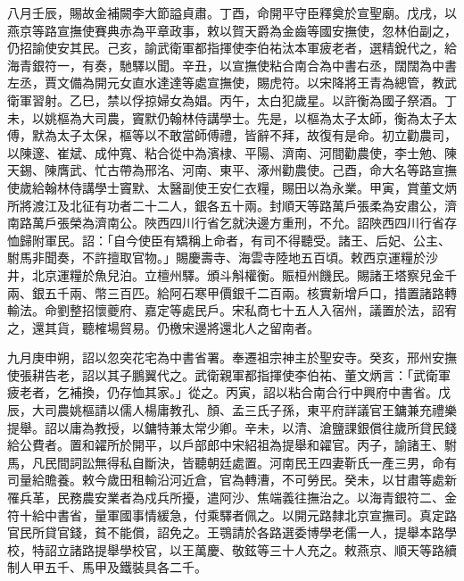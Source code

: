 \begin{pinyinscope}
 八月壬辰，賜故金補闕李大節謚貞肅。丁酉，命開平守臣釋奠於宣聖廟。戊戌，以燕京等路宣撫使賽典赤為平章政事，敕以賀天爵為金齒等國安撫使，忽林伯副之，仍招諭使安其民。己亥，諭武衛軍都指揮使李伯祐汰本軍疲老者，選精銳代之，給海青銀符一，有奏，馳驛以聞。辛丑，以宣撫使粘合南合為中書右丞，闊闊為中書左丞，賈文備為開元女直水達達等處宣撫使，賜虎符。以宋降將王青為總管，教武衛軍習射。乙巳，禁以俘掠婦女為娼。丙午，太白犯歲星。以許衡為國子祭酒。丁未，以姚樞為大司農，竇默仍翰林侍講學士。先是，以樞為太子太師，衡為太子太傅，默為太子太保，樞等以不敢當師傅禮，皆辭不拜，故復有是命。初立勸農司，以陳邃、崔斌、成仲寬、粘合從中為濱棣、平陽、濟南、河間勸農使，李士勉、陳天錫、陳膺武、忙古帶為邢洺、河南、東平、涿州勸農使。己酉，命大名等路宣撫使歲給翰林侍講學士竇默、太醫副使王安仁衣糧，賜田以為永業。甲寅，賞董文炳所將渡江及北征有功者二十二人，銀各五十兩。封順天等路萬戶張柔為安肅公，濟南路萬戶張榮為濟南公。陜西四川行省乞就決邊方重刑，不允。詔陜西四川行省存恤歸附軍民。詔：「自今使臣有矯稱上命者，有司不得聽受。諸王、后妃、公主、駙馬非聞奏，不許擅取官物。」賜慶壽寺、海雲寺陸地五百頃。敕西京運糧於沙井，北京運糧於魚兒泊。立檀州驛。頒斗斛權衡。賑桓州饑民。賜諸王塔察兒金千兩、銀五千兩、幣三百匹。給阿石寒甲價銀千二百兩。核實新增戶口，措置諸路轉輸法。命劉整招懷夔府、嘉定等處民戶。宋私商七十五人入宿州，議置於法，詔宥之，還其貨，聽榷場貿易。仍檄宋邊將還北人之留南者。



 九月庚申朔，詔以忽突花宅為中書省署。奉遷祖宗神主於聖安寺。癸亥，邢州安撫使張耕告老，詔以其子鵬翼代之。武衛親軍都指揮使李伯祐、董文炳言：「武衛軍疲老者，乞補換，仍存恤其家。」從之。丙寅，詔以粘合南合行中興府中書省。戊辰，大司農姚樞請以儒人楊庸教孔、顏、孟三氏子孫，東平府詳議官王鏞兼充禮樂提舉。詔以庸為教授，以鏞特兼太常少卿。辛未，以清、滄鹽課銀償往歲所貸民錢給公費者。置和糴所於開平，以戶部郎中宋紹祖為提舉和糴官。丙子，諭諸王、駙馬，凡民間詞訟無得私自斷決，皆聽朝廷處置。河南民王四妻靳氏一產三男，命有司量給贍養。敕今歲田租輸沿河近倉，官為轉漕，不可勞民。癸未，以甘肅等處新罹兵革，民務農安業者為戍兵所擾，遣阿沙、焦端義往撫治之。以海青銀符二、金符十給中書省，量軍國事情緩急，付乘驛者佩之。以開元路隸北京宣撫司。真定路官民所貸官錢，貧不能償，詔免之。王鶚請於各路選委博學老儒一人，提舉本路學校，特詔立諸路提舉學校官，以王萬慶、敬鉉等三十人充之。敕燕京、順天等路續制人甲五千、馬甲及鐵裝具各二千。




\end{pinyinscope}
